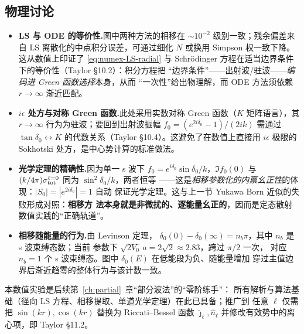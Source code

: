 \subsection*{物理讨论}
\begin{itemize}
\item \textbf{LS 与 ODE 的等价性.}\quad 图中两种方法的相移在
  $\sim 10^{-2}$ 级别一致；残余偏差来自 LS 离散化的中点积分误差，可通过细化
  $N$ 或换用 Simpson 权一致下降。这从数值上印证了 \eqref{eq:numex-LS-radial}
  与 Schrödinger 方程在适当边界条件下的等价性（Taylor §10.2）：积分方程把
  ``边界条件''——出射波/驻波——\emph{编码进 Green 函数选择}本身，从而
  ``一次性''给出物理解，而 ODE 方法须依赖 $r\to\infty$ 渐近匹配。
\item \textbf{$i\epsilon$ 处方与对称 Green 函数.}\quad 此处采用实数对称
  Green 函数（$K$ 矩阵语言），其 $r\to\infty$ 行为为驻波；要回到出射波振幅
  $f_0 = (e^{2i\delta_0}-1)/(2ik)$ 需通过 $\tan\delta_0 \leftrightarrow K$
  的代数关系（Taylor §10.4）。这避免了在数值上直接用 $i\epsilon$ 极限的
  Sokhotski 处方，是中心势计算的标准做法。
\item \textbf{光学定理的精确性.}\quad 因为单一 s 波下
  $f_0 = e^{i\delta_0}\sin\delta_0/k$，$\Im f_0(0)$ 与
  $(k/4\pi)\sigma_{\rm tot}^{\ell=0}$ 同为 $\sin^2\delta_0/k$，两者恒等
  ——这是\emph{相移参数化的内禀幺正性}的体现：$|S_0|=|e^{2i\delta_0}|=1$ 自动
  保证光学定理。这与上一节 Yukawa Born 近似的失败形成对照：\textbf{相移方
  法本身就是非微扰的、逐能量幺正的}，因而是定态散射数值实践的``正确轨道''。
\item \textbf{相移随能量的行为.}\quad 由 Levinson 定理，
  $\delta_0(0) - \delta_0(\infty) = n_b\pi$，其中 $n_b$ 是 s 波束缚态数；当前
  参数下 $\sqrt{2 V_0}\,a = 2\sqrt{2}\approx 2.83$，跨过 $\pi/2$ 一次，
  对应 $n_b = 1$ 个 s 波束缚态。图中 $\delta_0(E)$ 在低能段为负、随能量增加
  穿过主值边界后渐近趋零的整体行为与该计数一致。
\end{itemize}

\begin{remark}
本数值实验是后续第~\ref{ch:partial}~章``部分波法''的``零阶练手''：
所有解析与算法基础（径向 LS 方程、相移提取、单道光学定理）在此已具备；推广到
任意 $\ell$ 仅需把 $\sin(kr),\cos(kr)$ 替换为 Riccati--Bessel 函数
$\hat\jmath_\ell, \hat n_\ell$ 并修改有效势中的离心项，即 Taylor §11.2。
\end{remark}
